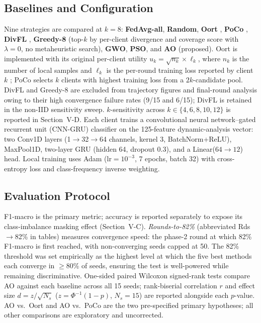 \documentclass[conference]{IEEEtran}
\begin{document}
\subsection{Baselines and Configuration}
Nine strategies are compared at $k=8$: \textbf{FedAvg-all}, \textbf{Random}, \textbf{Oort} \cite{lai2021oort}, \textbf{PoCo} \cite{cho2022poco}, \textbf{DivFL} \cite{balakrishnan2022divfl}, \textbf{Greedy-8} (top-$k$ by per-client divergence and coverage score with $\lambda{=}0$, no metaheuristic search), \textbf{GWO}, \textbf{PSO}, and \textbf{AO} (proposed). Oort is implemented with its original per-client utility $u_k = \sqrt{n_k} \times \ell_k$, where $n_k$ is the number of local samples and $\ell_k$ is the per-round training loss reported by client $k$ \cite{lai2021oort}; PoCo selects $k$ clients with highest training loss from a $2k$-candidate pool. DivFL and Greedy-8 are excluded from trajectory figures and final-round analysis owing to their high convergence failure rates (9/15 and 6/15); DivFL is retained in the non-IID sensitivity sweep. $k$-sensitivity across $k\in\{4,6,8,10,12\}$ is reported in Section~V-D. Each client trains a convolutional neural network--gated recurrent unit (CNN-GRU) classifier on the 125-feature dynamic-analysis vector: two Conv1D layers (1$\to$32$\to$64 channels, kernel 3, BatchNorm+ReLU), MaxPool1D, two-layer GRU (hidden 64, dropout 0.3), and a Linear($64\to12$) head. Local training uses Adam (lr$=10^{-3}$, 7 epochs, batch 32) with cross-entropy loss and class-frequency inverse weighting.

\subsection{Evaluation Protocol}
F1-macro is the primary metric; accuracy is reported separately to expose its class-imbalance masking effect (Section~V-C). \emph{Rounds-to-82\%} (abbreviated Rds$\to$82\% in tables) measures convergence speed: the phase-2 round at which 82\% F1-macro is first reached, with non-converging seeds capped at 50. The 82\% threshold was set empirically as the highest level at which the five best methods each converge in $\geq$80\% of seeds, ensuring the test is well-powered while remaining discriminative. One-sided paired Wilcoxon signed-rank tests compare AO against each baseline across all 15 seeds; rank-biserial correlation $r$ and effect size $d=z/\sqrt{N_s}$ ($z=\Phi^{-1}(1-p)$, $N_s=15$) are reported alongside each $p$-value. AO vs.\ Oort and AO vs.\ PoCo are the two pre-specified primary hypotheses; all other comparisons are exploratory and uncorrected.
\end{document}
